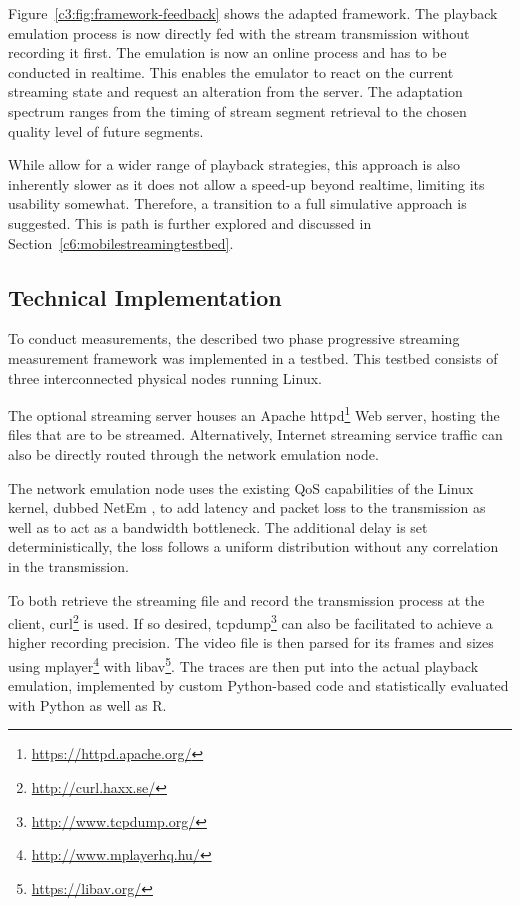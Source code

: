 Figure~\ref{c3:fig:framework-feedback} shows the adapted framework. The playback emulation process is now directly fed with the stream transmission without recording it first. The emulation is now an online process and has to be conducted in realtime. This enables the emulator to react on the current streaming state and request an alteration from the server. The adaptation spectrum ranges from the timing of stream segment retrieval to the chosen quality level of future segments. 

While allow for a wider range of playback strategies, this approach is also inherently slower as it does not allow a speed-up beyond realtime, limiting its usability somewhat. Therefore, a transition to a full simulative approach is suggested. This is path is further explored and discussed in Section~\ref{c6:mobilestreamingtestbed}.



\subsection{Technical Implementation}

To conduct measurements, the described two phase progressive streaming measurement framework was implemented in a testbed. This testbed consists of three interconnected physical nodes running Linux. 

The optional streaming server houses an Apache httpd\footnote{\url{https://httpd.apache.org/}} Web server, hosting the files that are to be streamed. Alternatively, Internet streaming service traffic can also be directly routed through the network emulation node.

The network emulation node uses the existing \gls{QoS} capabilities of the Linux kernel, dubbed NetEm \cite{hemminger2005network}, to add latency and packet loss to the transmission as well as to act as a bandwidth bottleneck. The additional delay is set deterministically, the loss follows a uniform distribution without any correlation in the transmission.

To both retrieve the streaming file and record the transmission process at the client, curl\footnote{\url{http://curl.haxx.se/}} is used. If so desired, tcpdump\footnote{\url{http://www.tcpdump.org/}} can also be facilitated to achieve a higher recording precision. The video file is then parsed for its frames and sizes using mplayer\footnote{\url{http://www.mplayerhq.hu/}} with libav\footnote{\url{https://libav.org/}}. The traces are then put into the actual playback emulation, implemented by custom Python-based code and statistically evaluated with Python as well as R.



